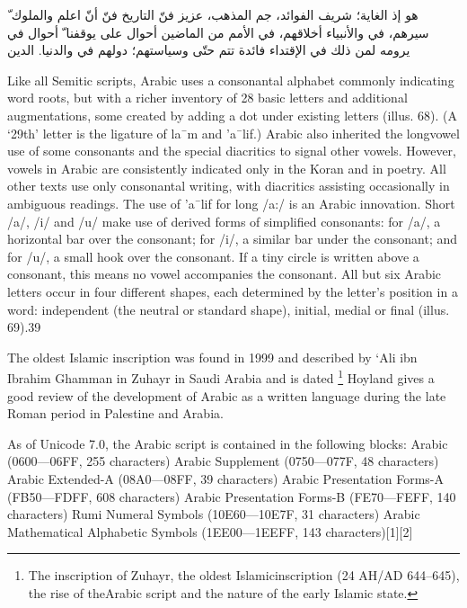 \begin{Arabic}
\arabian

ّ هو إذ الغاية؛ شريف الفوائد، جم المذهب، عزيز فنّ التاريخ فنّ أنّ اعلم
والملوك سيرهم، في والأنبياء أخلاقهم، في الأمم من الماضين أحوال على يوقفنا
ّ أحوال في يرومه لمن ذلك في الإقتداء فائدة تتم حتّى وسياستهم؛ دولهم في
والدنيا. الدين


\end{Arabic}

Like all Semitic scripts, Arabic uses a consonantal alphabet
commonly indicating word roots, but with a richer inventory of
28 basic letters and additional augmentations, some created by
adding a dot under existing letters (illus. 68). (A ‘29th’ letter is
the ligature of la¯m and ’a¯lif.) Arabic also inherited the longvowel
use of some consonants and the special diacritics to signal
other vowels. However, vowels in Arabic are consistently indicated
only in the Koran and in poetry. All other texts use only
consonantal writing, with diacritics assisting occasionally in
ambiguous readings. The use of ’a¯lif for long /a:/ is an Arabic
innovation. Short /a/, /i/ and /u/ make use of derived forms of
simplified consonants: for /a/, a horizontal bar over the consonant;
for /i/, a similar bar under the consonant; and for /u/, a
small hook over the consonant. If a tiny circle is written above a
consonant, this means no vowel accompanies the consonant. All
but six Arabic letters occur in four different shapes, each determined
by the letter’s position in a word: independent (the neutral
or standard shape), initial, medial or final (illus. 69).39

The oldest Islamic inscription was found in 1999 and described by ‘{}Ali ibn Ibrahim Ghamman in Zuhayr in 
Saudi Arabia and is dated \footnote{ 
The inscription of Zuhayr, the oldest Islamicinscription (24 AH/AD 644–645), the rise of theArabic script and the nature of the early Islamic state.} Hoyland\cite{hoyland2010} gives a good review of the development of Arabic as
a written language during the late Roman period in Palestine and Arabia. 




As of Unicode 7.0, the Arabic script is contained in the following blocks:
Arabic (0600—06FF, 255 characters)
Arabic Supplement (0750—077F, 48 characters)
Arabic Extended-A (08A0—08FF, 39 characters)
Arabic Presentation Forms-A (FB50—FDFF, 608 characters)
Arabic Presentation Forms-B (FE70—FEFF, 140 characters)
Rumi Numeral Symbols (10E60—10E7F, 31 characters)
Arabic Mathematical Alphabetic Symbols (1EE00—1EEFF, 143 characters)[1][2]

